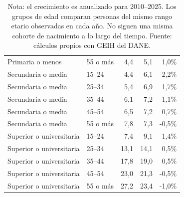 \begin{table}[H]
\begin{tabular}{@{}p{3.6cm}p{1.6cm}rrr@{}}
Primaria o menos & 55 o más & 4,4 & 5,1 & 1,0\% \\
\addlinespace[0.3em]
Secundaria o media & 15--24 & 4,4 & 6,1 & 2,2\% \\
Secundaria o media & 25--34 & 5,4 & 6,9 & 1,7\% \\
Secundaria o media & 35--44 & 6,1 & 7,2 & 1,1\% \\
Secundaria o media & 45--54 & 6,5 & 7,2 & 0,7\% \\
Secundaria o media & 55 o más & 7,8 & 7,3 & -0,5\% \\
\addlinespace[0.3em]
Superior o universitaria & 15--24 & 7,4 & 9,1 & 1,4\% \\
Superior o universitaria & 25--34 & 13,1 & 14,1 & 0,5\% \\
Superior o universitaria & 35--44 & 17,8 & 19,0 & 0,5\% \\
Superior o universitaria & 45--54 & 23,0 & 21,3 & -0,5\% \\
Superior o universitaria & 55 o más & 27,2 & 23,4 & -1,0\% \\
\bottomrule
\end{tabular}
\caption*{\footnotesize Nota: el crecimiento es anualizado para 2010--2025. Los grupos de edad comparan personas del mismo rango etario observadas en cada año. No siguen una misma cohorte de nacimiento a lo largo del tiempo. Fuente: cálculos propios con GEIH del DANE.}
\end{table}
